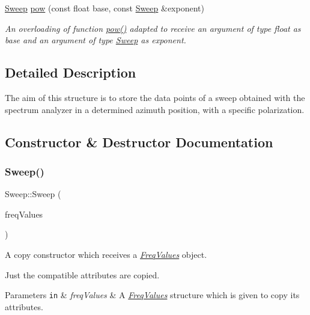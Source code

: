 \begin{DoxyCompactItemize}
\hyperlink{structSweep}{Sweep} \hyperlink{structSweep_a879ae44efd2611562d05b90b24099e70}{pow} (const float base, const \hyperlink{structSweep}{Sweep} \&exponent)
\begin{DoxyCompactList}\small\item\em An overloading of function {\ttfamily \hyperlink{structSweep_a09ee88cfc9b28e6ec344eea1a2817ea9}{pow()}} adapted to receive an argument of type {\itshape float} as base and an argument of type {\itshape \hyperlink{structSweep}{Sweep}} as exponent. \end{DoxyCompactList}\end{DoxyCompactItemize}


\subsection{Detailed Description}
The aim of this structure is to store the data points of a sweep obtained with the spectrum analyzer in a determined azimuth position, with a specific polarization. 

\subsection{Constructor \& Destructor Documentation}
\mbox{\label{structSweep_ae85ac9f2a48f93e3fc510118c7d67f7f}} 
\subsubsection{\texorpdfstring{Sweep()}{Sweep()}\hspace{0.1cm}{\footnotesize\ttfamily [1/2]}}
{\footnotesize\ttfamily Sweep\+::\+Sweep (\begin{DoxyParamCaption}\item[{const \hyperlink{structFreqValues}{Freq\+Values} \&}]{freq\+Values }\end{DoxyParamCaption})\hspace{0.3cm}{\ttfamily [inline]}}



A copy constructor which receives a {\itshape \hyperlink{structFreqValues}{Freq\+Values}} object. 

Just the compatible attributes are copied. 
\begin{DoxyParams}[1]{Parameters}
\mbox{\tt in}  & {\em freq\+Values} & A {\itshape \hyperlink{structFreqValues}{Freq\+Values}} structure which is given to copy its attributes. \\
\hline
\end{DoxyParams}
\mbox{\label{structSweep_a0a4e0f72fe9051d35cb29953005463b3}} 
